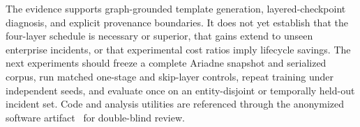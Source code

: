 \documentclass[conference]{IEEEtran}
\begin{document}
The evidence supports graph-grounded template generation, layered-checkpoint diagnosis, and explicit provenance boundaries. It does not yet establish that the four-layer schedule is necessary or superior, that gains extend to unseen enterprise incidents, or that experimental cost ratios imply lifecycle savings. The next experiments should freeze a complete Ariadne snapshot and serialized corpus, run matched one-stage and skip-layer controls, repeat training under independent seeds, and evaluate once on an entity-disjoint or temporally held-out incident set. Code and analysis utilities are referenced through the anonymized software artifact~\cite{anonartifact} for double-blind review.



\end{document}
